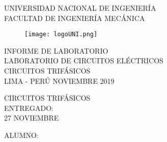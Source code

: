 \documentclass[a4paper,12pt]{report}
\begin{document}
\setcounter{page}{1}
\thispagestyle{empty}
\begin{center}
{\huge UNIVERSIDAD NACIONAL DE INGENIERÍA}\\[0.9cm]
{\Large FACULTAD DE INGENIERÍA MECÁNICA}\\[0.6in]
\end{center}
\begin{figure}[h]
\begin{center}
\texttt{[image: logoUNI.png]}
\vspace{0cm}
\end{center}
\end{figure}
\vspace{0.5cm}
\begin{center}
INFORME DE LABORATORIO\\
LABORATORIO DE CIRCUITOS ELÉCTRICOS\\[5mm]
{\large CIRCUITOS TRIFÁSICOS}\\[10mm]
\vfill
LIMA - PERÚ \hfill NOVIEMBRE 2019
\end{center}
\newpage
\thispagestyle{empty}
\begin{center}
{\Huge CIRCUITOS TRIFÁSICOS}\\[0.7cm]
\small ENTREGADO:\\[0.05cm]
\small 27 NOVIEMBRE\\[1.2cm]
\end{center}
\begin{flushleft}
{\large ALUMNO:}\\[2cm]
\end{flushleft}
\end{document}
